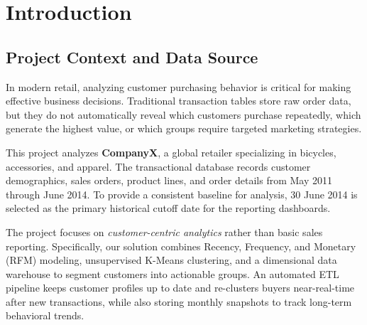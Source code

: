 \chapter{Introduction}
\label{chap:introduction}

\section{Project Context and Data Source}
In modern retail, analyzing customer purchasing behavior is critical for making effective business decisions. Traditional transaction tables store raw order data, but they do not automatically reveal which customers purchase repeatedly, which generate the highest value, or which groups require targeted marketing strategies. 

This project analyzes \textbf{CompanyX}, a global retailer specializing in bicycles, accessories, and apparel. The transactional database records customer demographics, sales orders, product lines, and order details from May 2011 through June 2014. To provide a consistent baseline for analysis, 30 June 2014 is selected as the primary historical cutoff date for the reporting dashboards.

The project focuses on \emph{customer-centric analytics} rather than basic sales reporting. Specifically, our solution combines Recency, Frequency, and Monetary (RFM) modeling, unsupervised K-Means clustering, and a dimensional data warehouse to segment customers into actionable groups. An automated ETL pipeline keeps customer profiles up to date and re-clusters buyers near-real-time after new transactions, while also storing monthly snapshots to track long-term behavioral trends.

